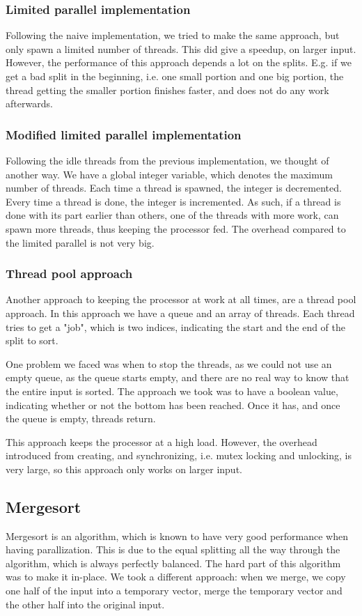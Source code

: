 \subsubsection{Limited parallel implementation}
Following the naive implementation, we tried to make the same approach, but
only spawn a limited number of threads. This did give a speedup, on larger
input. However, the performance of this approach depends a lot on the splits.
E.g. if we get a bad split in the beginning, i.e. one small portion and one big
portion, the thread getting the smaller portion finishes faster, and does not
do any work afterwards.

\subsubsection{Modified limited parallel implementation}
Following the idle threads from the previous implementation, we thought of
another way. We have a global integer variable, which denotes the maximum
number of threads. Each time a thread is spawned, the integer is decremented.
Every time a thread is done, the integer is incremented. As such, if a thread
is done with its part earlier than others, one of the threads with more work,
can spawn more threads, thus keeping the processor fed. The overhead compared
to the limited parallel is not very big.

\subsubsection{Thread pool approach}
Another approach to keeping the processor at work at all times, are a thread
pool approach. In this approach we have a queue and an array of threads. Each
thread tries to get a "job", which is two indices, indicating the start and the
end of the split to sort.

One problem we faced was when to stop the threads, as we could not use an empty
queue, as the queue starts empty, and there are no real way to know that the
entire input is sorted. The approach we took was to have a boolean value,
indicating whether or not the bottom has been reached. Once it has, and once
the queue is empty, threads return.

This approach keeps the processor at a high load. However, the overhead
introduced from creating, and synchronizing, i.e. mutex locking and unlocking,
is very large, so this approach only works on larger input.

\subsection{Mergesort}
Mergesort is an algorithm, which is known to have very good performance when
having parallization. This is due to the equal splitting all the way through
the algorithm, which is always perfectly balanced. The hard part of this
algorithm was to make it in-place. We took a different approach: when we merge,
we copy one half of the input into a temporary vector, merge the temporary
vector and the other half into the original input.

